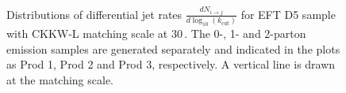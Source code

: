  \begin{figure}[h!]
 	\centering  
 	\hfill
 	\hfill
 	\hfill
 	\caption{Distributions of differential jet rates $\frac{dN_{i\to j}}{d \log_{10}(k_\textrm{cut})}$ for EFT D5 sample with CKKW-L matching scale at 30\,\gev. The 0-, 1- and 2-parton emission samples are generated separately and indicated in the plots as Prod 1, Prod 2 and Prod 3, respectively. A vertical line is drawn at the matching scale.}
 	\label{fig:CKKW_D5_30}
 \end{figure}


